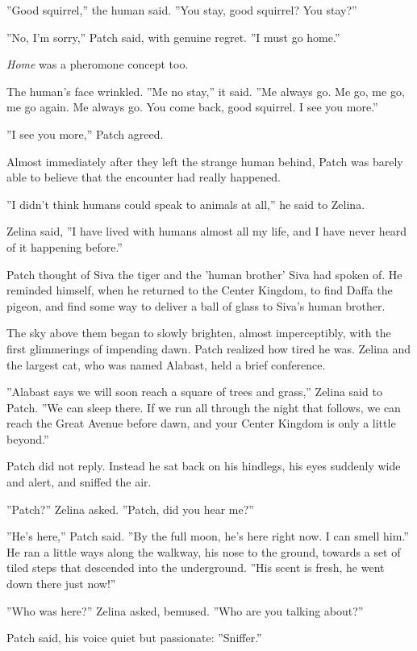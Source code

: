 \documentclass[12pt]{book}
\begin{document}
''Good squirrel,'' the human said. ''You stay, good squirrel? You stay?''

''No, I'm sorry,'' Patch said, with genuine regret. ''I must go home.''

{\it Home} was a pheromone concept too.

The human's face wrinkled. ''Me no stay,'' it said. ''Me always go. Me go, me go, me go again. Me always go. You come back, good squirrel. I see you more.''

''I see you more,'' Patch agreed.

Almost immediately after they left the strange human behind, Patch was barely able to believe that the encounter had really happened.

''I didn't think humans could speak to animals at all,'' he said to Zelina.

Zelina said, ''I have lived with humans almost all my life, and I have never heard of it happening before.''

Patch thought of Siva the tiger and the 'human brother' Siva had spoken of. He reminded himself, when he returned to the Center Kingdom, to find Daffa the pigeon, and find some way to deliver a ball of glass to Siva's human brother.

The sky above them began to slowly brighten, almost imperceptibly, with the first glimmerings of impending dawn. Patch realized how tired he was. Zelina and the largest cat, who was named Alabast, held a brief conference.

''Alabast says we will soon reach a square of trees and grass,'' Zelina said to Patch. ''We can sleep there. If we run all through the night that follows, we can reach the Great Avenue before dawn, and your Center Kingdom is only a little beyond.''

Patch did not reply. Instead he sat back on his hindlegs, his eyes suddenly wide and alert, and sniffed the air.

''Patch?'' Zelina asked. ''Patch, did you hear me?''

''He's here,'' Patch said. ''By the full moon, he's here right now. I can smell him.'' He ran a little ways along the walkway, his nose to the ground, towards a set of tiled steps that descended into the underground. ''His scent is fresh, he went down there just now!''

''Who was here?'' Zelina asked, bemused. ''Who are you talking about?''

Patch said, his voice quiet but passionate: ''Sniffer.''
\end{document}
